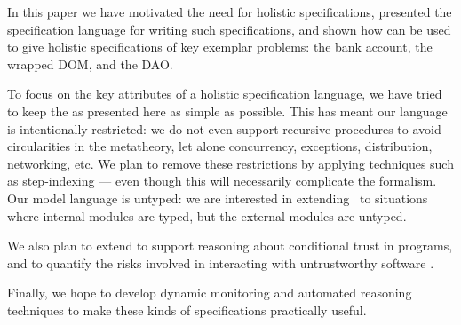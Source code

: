 In this paper we have motivated the need for holistic specifications,
presented the \Chainmail specification language for writing such
specifications, and shown how \Chainmail can be used to give holistic
specifications of key exemplar problems: the bank account, the
wrapped DOM, and the DAO.

To focus on the key attributes of a holistic specification language,
we have tried to keep the \Chainmail as presented here as simple as
possible. This has meant our language is intentionally restricted: we
do not even support recursive procedures to avoid circularities in the
metatheory, let alone concurrency, exceptions, distribution,
networking, etc.  We plan to remove these restrictions by applying
techniques such as step-indexing \cite{dd} --- even though this will
necessarily complicate the formalism. Our model language \LangOO is
untyped: we are interested in extending \Chainmail\ to situations
where internal modules are typed, but the external modules are untyped.

%
We also plan to extend \Chainmail to support reasoning about
conditional trust in programs, and to quantify the risks involved in
interacting with untrustworthy software \cite{swapsies}.

Finally, we hope to develop dynamic monitoring and
automated reasoning techniques to make these kinds of specifications
practically useful.
